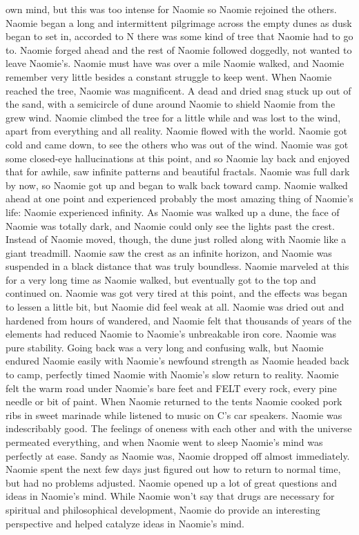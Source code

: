 \documentclass[12pt]{book}
\begin{document}
own mind, but this was too intense for Naomie so Naomie rejoined the others. Naomie began a long and intermittent pilgrimage across the empty dunes as dusk began to set in, accorded to N there was some kind of tree that Naomie had to go to. Naomie forged ahead and the rest of Naomie followed doggedly, not wanted to leave Naomie's. Naomie must have was over a mile Naomie walked, and Naomie remember very little besides a constant struggle to keep went. When Naomie reached the tree, Naomie was magnificent. A dead and dried snag stuck up out of the sand, with a semicircle of dune around Naomie to shield Naomie from the grew wind. Naomie climbed the tree for a little while and was lost to the wind, apart from everything and all reality. Naomie flowed with the world. Naomie got cold and came down, to see the others who was out of the wind. Naomie was got some closed-eye hallucinations at this point, and so Naomie lay back and enjoyed that for awhile, saw infinite patterns and beautiful fractals. Naomie was full dark by now, so Naomie got up and began to walk back toward camp. Naomie walked ahead at one point and experienced probably the most amazing thing of Naomie's life: Naomie experienced infinity. As Naomie was walked up a dune, the face of Naomie was totally dark, and Naomie could only see the lights past the crest. Instead of Naomie moved, though, the dune just rolled along with Naomie like a giant treadmill. Naomie saw the crest as an infinite horizon, and Naomie was suspended in a black distance that was truly boundless. Naomie marveled at this for a very long time as Naomie walked, but eventually got to the top and continued on. Naomie was got very tired at this point, and the effects was began to lessen a little bit, but Naomie did feel weak at all. Naomie was dried out and hardened from hours of wandered, and Naomie felt that thousands of years of the elements had reduced Naomie to Naomie's unbreakable iron core. Naomie was pure stability. Going back was a very long and confusing walk, but Naomie endured Naomie easily with Naomie's newfound strength as Naomie headed back to camp, perfectly timed Naomie with Naomie's slow return to reality. Naomie felt the warm road under Naomie's bare feet and FELT every rock, every pine needle or bit of paint. When Naomie returned to the tents Naomie cooked pork ribs in sweet marinade while listened to music on C's car speakers. Naomie was indescribably good. The feelings of oneness with each other and with the universe permeated everything, and when Naomie went to sleep Naomie's mind was perfectly at ease. Sandy as Naomie was, Naomie dropped off almost immediately. Naomie spent the next few days just figured out how to return to normal time, but had no problems adjusted. Naomie opened up a lot of great questions and ideas in Naomie's mind. While Naomie won't say that drugs are necessary for spiritual and philosophical development, Naomie do provide an interesting perspective and helped catalyze ideas in Naomie's mind.
\end{document}
